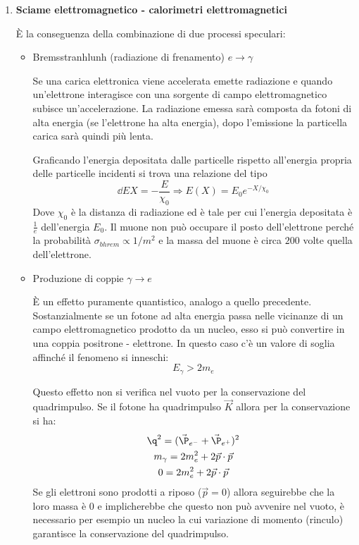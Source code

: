 \documentclass[12pt]{book}
\begin{document}
\begin{enumerate}
\item \textbf{Sciame elettromagnetico - calorimetri elettromagnetici}

È la conseguenza della combinazione di due processi speculari:
\begin{itemize}
	\item Bremsstranhlunh (radiazione di frenamento) $\boxed{e}\rightarrow\gamma $
	
	Se una carica elettronica viene accelerata emette radiazione e quando un'elettrone interagisce con una sorgente di campo elettromagnetico subisce un'accelerazione. La radiazione emessa sarà composta da fotoni di alta energia (se l'elettrone ha alta energia), dopo l'emissione la particella carica sarà quindi più lenta.
		
	Graficando l'energia depositata dalle particelle rispetto all'energia propria delle particelle incidenti si trova una relazione del tipo
	\begin{equation}
		\dd{E}{X} = -\frac{E}{\chi_0} \Rightarrow E(X)=E_0 e^{-X/\chi_0}
	\end{equation}
	Dove $\chi_0$ è la distanza di radiazione ed è tale per cui l'energia depositata è $\frac{1}{e}$ dell'energia $E_0$. Il muone non può occupare il posto dell'elettrone perché la probabilità $\sigma_{bhrem} \propto 1/m^2$ e la massa del muone è circa $200$ volte quella dell'elettrone.
	
	\item Produzione di coppie $\boxed{\gamma}\rightarrow e$
	
	È un effetto puramente quantistico, analogo a quello precedente. Sostanzialmente se un fotone ad alta energia passa nelle vicinanze di un campo elettromagnetico prodotto da un nucleo, esso si può convertire in una coppia positrone - elettrone. In questo caso c'è un valore di soglia affinché il fenomeno si inneschi:
	\begin{equation}
		E_\gamma > 2 m_e
	\end{equation}
	
	
	Questo effetto non si verifica nel vuoto per la conservazione del quadrimpulso. Se il fotone ha quadrimpulso $\vec K$ allora per la conservazione si ha:
\begin{gather}
	\q ^2 = (\vec \P_{e^-} + \vec \P_{e^+}  )^2\\
	m_\gamma = 2m_e^2 + 2 \vec p \cdot \vec p\\
	0 = 2m_e^2 + 2 \vec p \cdot \vec p
\end{gather}
Se gli elettroni sono prodotti a riposo ($\vec p=0$) allora seguirebbe che la loro massa è 0 e implicherebbe che questo non può avvenire nel vuoto, è necessario per esempio un nucleo la cui variazione di momento (rinculo) garantisce la conservazione del quadrimpulso.


\end{itemize}
\end{enumerate}
\end{document}
